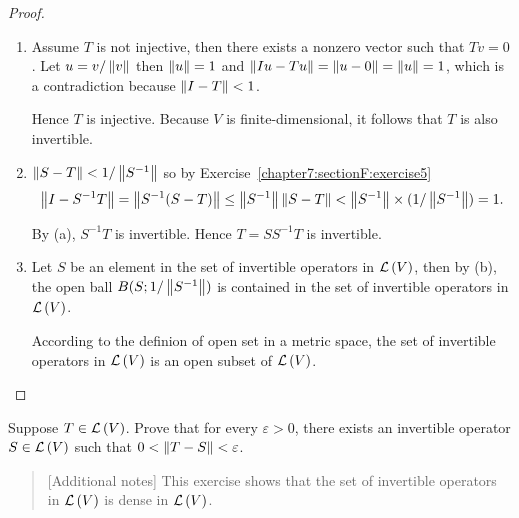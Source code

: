 \begin{proof}
    \begin{enumerate}[label={(\alph*)}]
        \item Assume $T$ is not injective, then there exists a nonzero vector such that $Tv = 0$. Let $u = v/\left\Vert{v}\right\Vert$ then $\left\Vert{u}\right\Vert = 1$ and $\left\Vert{Iu - Tu}\right\Vert = \left\Vert{u - 0}\right\Vert = \left\Vert{u}\right\Vert = 1$, which is a contradiction because $\left\Vert{I - T}\right\Vert < 1$.

              Hence $T$ is injective. Because $V$ is finite-dimensional, it follows that $T$ is also invertible.
        \item $\left\Vert{S - T}\right\Vert < 1/\left\Vert{S^{-1}}\right\Vert$ so by Exercise~\ref{chapter7:sectionF:exercise5}
              \[
                  \left\Vert{I - S^{-1}T}\right\Vert = \left\Vert{S^{-1}(S - T)}\right\Vert\leq \left\Vert{S^{-1}}\right\Vert\left\Vert{S - T}\right\Vert < \left\Vert{S^{-1}}\right\Vert\times (1/\left\Vert{S^{-1}}\right\Vert) = 1.
              \]

              By (a), $S^{-1}T$ is invertible. Hence $T = SS^{-1}T$ is invertible.
        \item Let $S$ be an element in the set of invertible operators in $\mathcal{L}\left({V}\right)$, then by (b), the open ball $B(S; 1/\left\Vert{S^{-1}}\right\Vert)$ is contained in the set of invertible operators in $\mathcal{L}\left({V}\right)$.

              According to the definion of open set in a metric space, the set of invertible operators in $\mathcal{L}\left({V}\right)$ is an open subset of $\mathcal{L}\left({V}\right)$.
    \end{enumerate}
\end{proof}
\newpage

\begin{exercise}
    Suppose $T \in \mathcal{L}\left({V}\right)$. Prove that for every $\varepsilon > 0$, there exists an invertible operator $S \in \mathcal{L}\left({V}\right)$ such that $0 < \left\Vert{T - S}\right\Vert < \varepsilon$.
\end{exercise}

\begin{quote}[Additional notes]
    This exercise shows that the set of invertible operators in $\mathcal{L}\left({V}\right)$ is dense in $\mathcal{L}\left({V}\right)$.
\end{quote}

